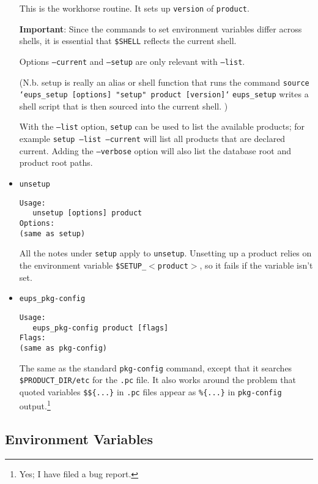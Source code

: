 \documentclass{article}
\newcommand{\code}[1]{\texttt{#1}}
\begin{document}
\begin{itemize}
This is the workhorse routine. It sets up \code{version} of \code{product}.

\textbf{Important}: Since the commands to set environment variables differ across shells,
it is essential that \code{\$SHELL} reflects the current shell.

Options \code{--current} and \code{--setup} are only relevant with \code{--list}.

(N.b. setup is really an alias or shell function that runs the command\hfil\break
\code{source `eups\_setup [options] "setup" product [version]`}\hfil\break
\code{eups\_setup} writes a shell script that is then sourced into the
current shell.
)

With the \code{--list} option, \code{setup} can be used to list the available
products; for example \code{setup --list --current} will list all products that
are declared current. Adding the \code{--verbose} option will also
list the database root and product root paths.


\item \code{unsetup}
\begin{verbatim}
Usage:
   unsetup [options] product
Options:
(same as setup)
\end{verbatim}
  
All the notes under \code{setup} apply to
\code{unsetup}. Unsetting up a product relies on the environment
variable \code{\$SETUP\_$<$product$>$}, so it fails if the variable
isn't set.

\item \code{eups\_pkg-config}
\begin{verbatim}
Usage:
   eups_pkg-config product [flags]
Flags:
(same as pkg-config)
\end{verbatim}

The same as the standard \code{pkg-config} command, except that it
searches \code{\$PRODUCT\_DIR/etc} for the \code{.pc} file.  It also
works around the problem that quoted variables \code{\$\$\{...\}}
in \code{.pc} files appear as \code{\%\{...\}} in \code{pkg-config} output.\footnote{
  Yes; I have filed a bug report.}

\end{itemize}

\subsection{Environment Variables}
\end{document}
